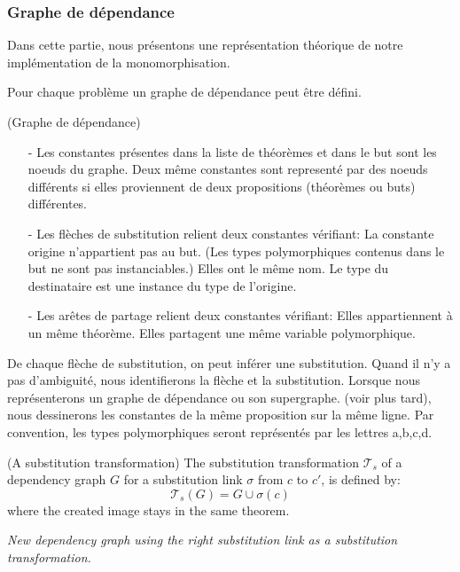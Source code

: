 \subsubsection{Graphe de dépendance}
Dans cette partie, nous présentons une représentation théorique de notre implémentation de la monomorphisation. 
\vspace{2mm}

\noindent Pour chaque problème un graphe de dépendance peut \^etre défini.
\begin{mydef} (Graphe de dépendance)
\begin{enumerate}
  \item [-] Les constantes présentes dans la liste de théorèmes et dans le but sont les noeuds du graphe. Deux m\^eme constantes sont representé par des noeuds différents si elles proviennent de deux propositions (théorèmes ou buts) différentes.
  \item [-] Les flèches de {\color{blue}substitution} relient deux constantes vérifiant: 
    \subitem La constante origine n'appartient pas au but. (Les types polymorphiques contenus dans le but ne sont pas instanciables.)
    \subitem Elles ont le m\^eme nom.
    \subitem Le type du destinataire est une instance du type de l'origine.
  \item [-] Les ar\^etes de {\color{green}partage} relient deux constantes vérifiant:
    \subitem Elles appartiennent à un m\^eme théorème.
    \subitem Elles partagent une m\^eme variable polymorphique.   
\end{enumerate}    
De chaque flèche de substitution, on peut inférer une substitution. Quand il n'y a pas d'ambiguité, nous identifierons la flèche et la substitution.
Lorsque nous représenterons un graphe de dépendance ou son supergraphe.  (voir plus tard), nous dessinerons les constantes de la m\^eme proposition sur la m\^eme ligne. Par convention, les types polymorphiques seront représentés par les lettres a,b,c,d.
\end{mydef}


\begin{mydef} (A substitution transformation)
The substitution transformation $\mathcal{T}_s$ of a dependency graph $G$ for a substitution link $\sigma$ from $c$ to $c'$, is defined by:
\[\mathcal{T}_s(G) = G \cup \sigma(c) \]
where the created image stays in the same theorem.
\end{mydef}

\iffalse
\noindent \textit{New dependency graph using the right substitution link as a substitution transformation.}

